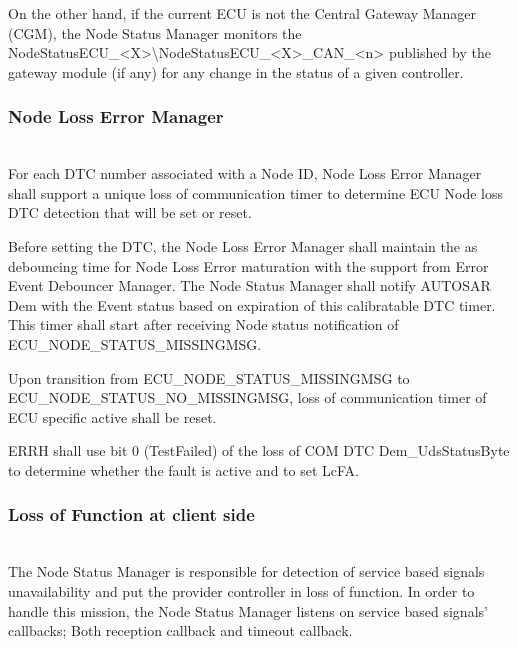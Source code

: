 On the other hand, if the current ECU is not the Central Gateway Manager (CGM), the Node Status Manager monitors the NodeStatusECU_<X>\textbackslash NodeStatusECU_<X>_CAN_<n> published by the gateway module (if any) for any change in the status of a given controller.


{}


\subsubsection{Node Loss Error Manager}
\label{subsec:NodeLossErrManager}
\\
For each DTC number associated with a Node ID, Node Loss Error Manager shall support a unique loss of communication timer to determine ECU Node loss DTC detection that will be set or reset.

Before setting the DTC, the Node Loss Error Manager shall maintain the  as debouncing time for Node Loss Error maturation with the support from Error Event Debouncer Manager. The Node Status Manager shall notify AUTOSAR Dem with the Event status based on expiration of this calibratable DTC timer. This timer shall start after receiving Node status notification of ECU_NODE_STATUS_MISSINGMSG.

Upon transition from ECU_NODE_STATUS_MISSINGMSG to ECU_NODE_STATUS_NO_MISSINGMSG, loss of communication timer of ECU specific active shall be reset.

ERRH shall use bit 0 (TestFailed) of the loss of COM DTC Dem_UdsStatusByte to determine whether the fault is active and to set LcFA.

{       }


\subsubsection{Loss of Function at client side}
\\

The Node Status Manager is responsible for detection of service based signals unavailability and put the provider controller
in loss of function.
In order to handle this mission, the Node Status Manager listens on service based signals' callbacks; Both reception callback and timeout callback.

